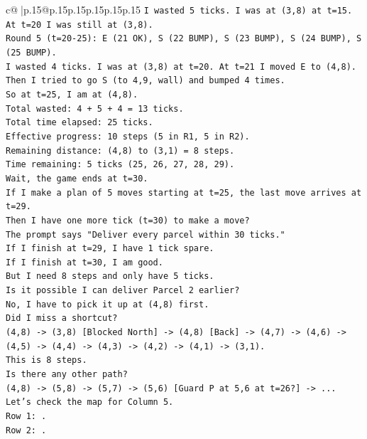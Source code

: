 \documentclass{article}
\begin{document}
{\begin{supertabular}{c@{$\;$}|p{.15\linewidth}@{}p{.15\linewidth}p{.15\linewidth}p{.15\linewidth}p{.15\linewidth}p{.15\linewidth}}
{{{\texttt{I wasted 5 ticks. I was at (3,8) at t=15. At t=20 I was still at (3,8).} \\
\texttt{Round 5 (t=20{-}25): E (21 OK), S (22 BUMP), S (23 BUMP), S (24 BUMP), S (25 BUMP).} \\
\texttt{I wasted 4 ticks. I was at (3,8) at t=20. At t=21 I moved E to (4,8). Then I tried to go S (to 4,9, wall) and bumped 4 times.} \\
\texttt{So at t=25, I am at (4,8).} \\
\texttt{Total wasted: 4 + 5 + 4 = 13 ticks.} \\
\texttt{Total time elapsed: 25 ticks.} \\
\texttt{Effective progress: 10 steps (5 in R1, 5 in R2).} \\
\texttt{Remaining distance: (4,8) to (3,1) = 8 steps.} \\
\texttt{Time remaining: 5 ticks (25, 26, 27, 28, 29).} \\
\texttt{Wait, the game ends at t=30.} \\
\texttt{If I make a plan of 5 moves starting at t=25, the last move arrives at t=29.} \\
\texttt{Then I have one more tick (t=30) to make a move?} \\
\texttt{The prompt says "Deliver every parcel within 30 ticks."} \\
\texttt{If I finish at t=29, I have 1 tick spare.} \\
\texttt{If I finish at t=30, I am good.} \\
\texttt{But I need 8 steps and only have 5 ticks.} \\
\texttt{Is it possible I can deliver Parcel 2 earlier?} \\
\texttt{No, I have to pick it up at (4,8) first.} \\
\texttt{Did I miss a shortcut?} \\
\texttt{(4,8) {-}> (3,8) {[}Blocked North{]} {-}> (4,8) {[}Back{]} {-}> (4,7) {-}> (4,6) {-}> (4,5) {-}> (4,4) {-}> (4,3) {-}> (4,2) {-}> (4,1) {-}> (3,1).} \\
\texttt{This is 8 steps.} \\
\texttt{Is there any other path?} \\
\texttt{(4,8) {-}> (5,8) {-}> (5,7) {-}> (5,6) {[}Guard P at 5,6 at t=26?{]} {-}> ...} \\
\texttt{Let's check the map for Column 5.} \\
\texttt{Row 1: .} \\
\texttt{Row 2: .} \\
}}}
\end{supertabular}}
\end{document}
